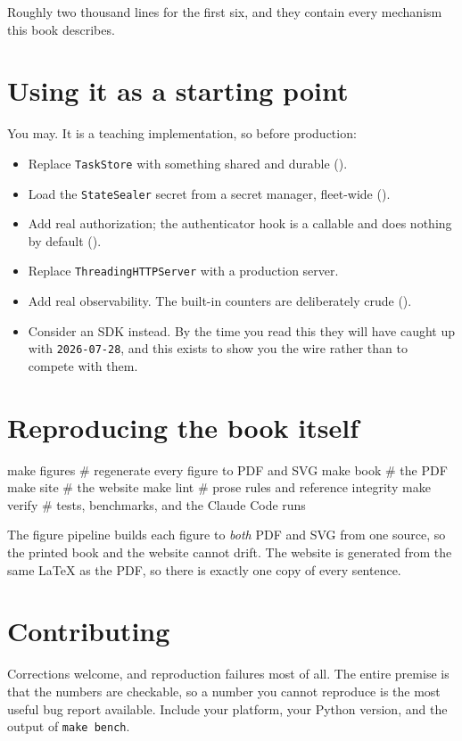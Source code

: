 Roughly two thousand lines for the first six, and they contain every mechanism
this book describes.

\section{Using it as a starting point}

You may. It is a teaching implementation, so before production:

\begin{itemize}[leftmargin=1.6em, itemsep=3pt]
\item Replace \texttt{TaskStore} with something shared and durable
().
\item Load the \texttt{StateSealer} secret from a secret manager, fleet-wide
().
\item Add real authorization; the authenticator hook is a callable and does
nothing by default ().
\item Replace \texttt{ThreadingHTTPServer} with a production server.
\item Add real observability. The built-in counters are deliberately crude
().
\item Consider an SDK instead. By the time you read this they will have caught
up with \texttt{2026-07-28}, and this exists to show you the wire rather than to
compete with them.
\end{itemize}

\section{Reproducing the book itself}

\begin{sh}
make figures    # regenerate every figure to PDF and SVG
make book       # the PDF
make site       # the website
make lint       # prose rules and reference integrity
make verify     # tests, benchmarks, and the Claude Code runs
\end{sh}

The figure pipeline builds each figure to \emph{both} PDF and SVG from one
source, so the printed book and the website cannot drift. The website is
generated from the same LaTeX as the PDF, so there is exactly one copy of every
sentence.

\section{Contributing}

Corrections welcome, and reproduction failures most of all. The entire premise
is that the numbers are checkable, so a number you cannot reproduce is the most
useful bug report available. Include your platform, your Python version, and the
output of \texttt{make bench}.
